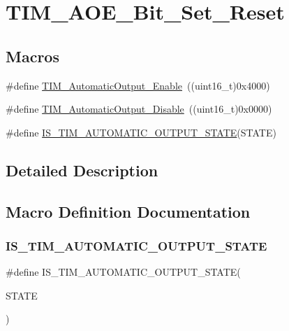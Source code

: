 \hypertarget{group___t_i_m___a_o_e___bit___set___reset}{}\section{T\+I\+M\+\_\+\+A\+O\+E\+\_\+\+Bit\+\_\+\+Set\+\_\+\+Reset}
\label{group___t_i_m___a_o_e___bit___set___reset}
\subsection*{Macros}
\begin{DoxyCompactItemize}
\item 
\#define \mbox{\hyperlink{group___t_i_m___a_o_e___bit___set___reset_gaa416873d01fe62fe8d3f9c8bb7853fa1}{T\+I\+M\+\_\+\+Automatic\+Output\+\_\+\+Enable}}~((uint16\+\_\+t)0x4000)
\item 
\#define \mbox{\hyperlink{group___t_i_m___a_o_e___bit___set___reset_ga0f80ba4fbadd434bc82ca63e904ace41}{T\+I\+M\+\_\+\+Automatic\+Output\+\_\+\+Disable}}~((uint16\+\_\+t)0x0000)
\item 
\#define \mbox{\hyperlink{group___t_i_m___a_o_e___bit___set___reset_gaabce6b8865d80929bf69c6c3c7780846}{I\+S\+\_\+\+T\+I\+M\+\_\+\+A\+U\+T\+O\+M\+A\+T\+I\+C\+\_\+\+O\+U\+T\+P\+U\+T\+\_\+\+S\+T\+A\+TE}}(S\+T\+A\+TE)
\end{DoxyCompactItemize}


\subsection{Detailed Description}


\subsection{Macro Definition Documentation}
\mbox{\label{group___t_i_m___a_o_e___bit___set___reset_gaabce6b8865d80929bf69c6c3c7780846}} 
\subsubsection{\texorpdfstring{IS\_TIM\_AUTOMATIC\_OUTPUT\_STATE}{IS\_TIM\_AUTOMATIC\_OUTPUT\_STATE}}
{\footnotesize\ttfamily \#define I\+S\+\_\+\+T\+I\+M\+\_\+\+A\+U\+T\+O\+M\+A\+T\+I\+C\+\_\+\+O\+U\+T\+P\+U\+T\+\_\+\+S\+T\+A\+TE(\begin{DoxyParamCaption}\item[{}]{S\+T\+A\+TE }\end{DoxyParamCaption})}


